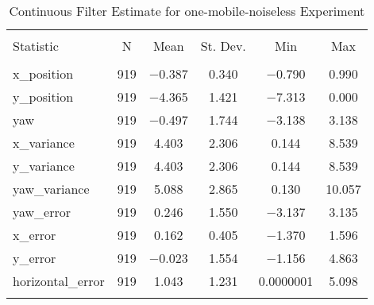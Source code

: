 
\begin{table}[h] \centering 
  \caption{Continuous Filter Estimate for one-mobile-noiseless Experiment} 
  \label{tab:one_mobile_noiseless_continuous_summary} 
\begin{tabular}{@{\extracolsep{5pt}}lccccc} 
\\[-1.8ex]\hline 
\hline \\[-1.8ex] 
Statistic & \multicolumn{1}{c}{N} & \multicolumn{1}{c}{Mean} & \multicolumn{1}{c}{St. Dev.} & \multicolumn{1}{c}{Min} & \multicolumn{1}{c}{Max} \\ 
\hline \\[-1.8ex] 
x\_position & 919 & $-$0.387 & \num{0.340} & $-$0.790 & \num{0.990} \\ 
y\_position & 919 & $-$4.365 & \num{1.421} & $-$7.313 & \num{0.000} \\ 
yaw & 919 & $-$0.497 & \num{1.744} & $-$3.138 & \num{3.138} \\ 
x\_variance & 919 & \num{4.403} & \num{2.306} & \num{0.144} & \num{8.539} \\ 
y\_variance & 919 & \num{4.403} & \num{2.306} & \num{0.144} & \num{8.539} \\ 
yaw\_variance & 919 & \num{5.088} & \num{2.865} & \num{0.130} & \num{10.057} \\ 
yaw\_error & 919 & \num{0.246} & \num{1.550} & $-$3.137 & \num{3.135} \\ 
x\_error & 919 & \num{0.162} & \num{0.405} & $-$1.370 & \num{1.596} \\ 
y\_error & 919 & $-$0.023 & \num{1.554} & $-$1.156 & \num{4.863} \\ 
horizontal\_error & 919 & \num{1.043} & \num{1.231} & \num{0.0000001} & \num{5.098} \\ 
\hline \\[-1.8ex] 
\end{tabular} 
\end{table} 
